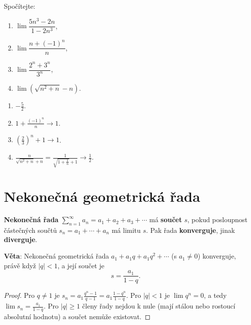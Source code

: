\begin{problem}
  Spočítejte:
  \begin{enumerate}[label=(\alph*)]
    \item $\lim\dfrac{5n^3 - 2n}{1 - 2n^3}$,
    \item $\lim\dfrac{n + {(-1)}^n}{n}$,
    \item $\lim\dfrac{2^n + 3^n}{3^n}$,
    \item $\lim\left(\sqrt{n^2 + n} - n\right)$.
  \end{enumerate}
\end{problem}

\begin{solution}
  \begin{enumerate}[label=(\alph*)]
    \item $-\frac{5}{2}$.
    \item $1 + \frac{{(-1)}^n}{n}\to 1$.
    \item ${\left(\frac{2}{3}\right)}^n + 1\to 1$.
    \item $\frac{n}{\sqrt{n^2 + n} + n} = \frac{1}{\sqrt{1 + \frac{1}{n}} + 1}\to\frac{1}{2}$.
  \end{enumerate}
\end{solution}

\section{Nekonečná geometrická řada}\label{sec:geometricka-rada}

\begin{definitionbox}
  \textbf{Nekonečná řada} $\sum_{n=1}^{\infty} a_n = a_1 + a_2 + a_3 + \cdots$ má \textbf{součet} $s$, pokud posloupnost částečných součtů $s_n = a_1 + \cdots + a_n$ má limitu $s$. Pak řada \textbf{konverguje}, jinak \textbf{diverguje}.

  \vspace{0.2cm}

  \textbf{Věta}: Nekonečná geometrická řada $a_1 + a_1q + a_1q^2 + \cdots$ (s $a_1\neq 0$) konverguje, právě když $|q| < 1$, a její součet je
  \begin{equation*}
    s = \frac{a_1}{1 - q}.
  \end{equation*}
\end{definitionbox}

\begin{proof}
  Pro $q\neq 1$ je $s_n = a_1\frac{q^n - 1}{q - 1} = a_1\frac{1 - q^n}{1 - q}$. Pro $|q| < 1$ je $\lim q^n = 0$, a tedy $\lim s_n = \frac{a_1}{1 - q}$. Pro $|q|\geq 1$ členy řady nejdou k nule (mají stálou nebo rostoucí absolutní hodnotu) a součet nemůže existovat.
\end{proof}

